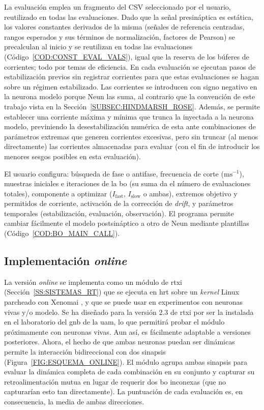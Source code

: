 La evaluación emplea un fragmento del CSV seleccionado por el usuario, reutilizado en todas las evaluaciones. Dado que la señal presináptica es estática, los valores constantes derivados de la misma (señales de referencia centradas, rangos esperados y sus términos de normalización, factores de Pearson) se precalculan al inicio y se reutilizan en todas las evaluaciones (Código~\ref{COD:CONST_EVAL_VALS}), igual que la reserva de los búferes de corrientes; todo por temas de eficiencia. En cada evaluación se ejecutan pasos de estabilización previos sin registrar corrientes para que estas evaluaciones se hagan sobre un régimen estabilizado. Las corrientes se introducen con signo negativo en la neurona modelo porque Neun las suma, al contrario que la convención de este trabajo vista en la Sección~\ref{SUBSEC:HINDMARSH_ROSE}. Además, se permite establecer una corriente máxima y mínima que trunca la inyectada a la neurona modelo, previniendo la desestabilización numérica de esta ante combinaciones de parámetros extremas que generen corrientes excesivas, pero sin truncar (al menos directamente) las corrientes almacenadas para evaluar (con el fin de introducir los menores sesgos posibles en esta evaluación).

El usuario configura: búsqueda de fase o antifase, frecuencia de corte (\(\mathrm{ms}^{-1}\)), muestras iniciales e iteraciones de la \ac{bo} (su suma da el número de evaluaciones totales), componente a optimizar (\(I_{\mathrm{fast}}\), \(I_{\mathrm{slow}}\) o ambas), extremos objetivo y permitidos de corriente, activación de la corrección de \textit{drift}, y parámetros temporales (estabilización, evaluación, observación). El programa permite cambiar fácilmente el modelo postsináptico a otro de Neun mediante plantillas (Código~\ref{COD:BO_MAIN_CALL}).


\subsection{Implementación \textit{online}\label{SUBSEC:IMPLEMENTACION_ONLINE}}

La versión \textit{online} se implementa como un módulo de \ac{rtxi} \cite{RTXI2010} (Sección~\ref{SS:SISTEMAS_RT}) que se ejecuta en \ac{hrt} sobre un \textit{kernel} Linux parcheado con Xenomai \cite{Xenomai2004}, y que se puede usar en experimentos con neuronas vivas y/o modelo. Se ha diseñado para la versión 2.3 de \ac{rtxi} por ser la instalada en el laboratorio del \ac{gnb} de la \ac{uam}, lo que permitirá probar el módulo próximamente con neuronas vivas. Aun así, es fácilmente adaptable a versiones posteriores. Ahora, el hecho de que ambas neuronas puedan ser dinámicas permite la interacción bidireccional con dos sinapsis (Figura~\ref{FIG:ESQUEMA_ONLINE}). El módulo agrupa ambas sinapsis para evaluar la dinámica completa de cada combinación en su conjunto y capturar su retroalimentación mutua en lugar de requerir dos \ac{bo} inconexas (que no capturarían esto tan directamente). La puntuación de cada evaluación es, en consecuencia, la media de ambas direcciones.

